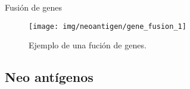 \documentclass[10pt]{beamer}
\newcommand{\1}{
	\setbeamertemplate{background}{
		\texttt{[image: img/1]}
		\tikz[overlay] \fill[fill opacity=0.75,fill=white] (0,0) rectangle (-\paperwidth,\paperheight);
	}
}
\begin{document}
\begin{frame}{Fusión de genes}{}
	\begin{figure}[h]
		\centering
		\texttt{[image: img/neoantigen/gene\_fusion\_1]}
		\caption{Ejemplo de una fución de genes.}
		\label{fig:cnv}
	\end{figure}	
\end{frame}




\subsection{Neo antígenos}
\end{document}
